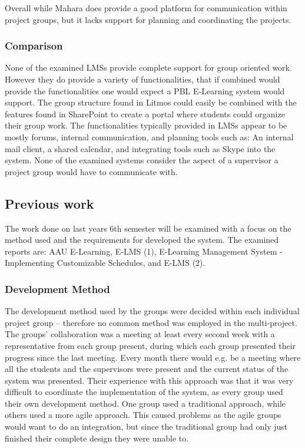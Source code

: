 Overall while Mahara does provide a good platform for communication within project groups, but it lacks support for planning and coordinating the projects.

\subsubsection{Comparison}
None of the examined LMSs provide complete support for group oriented work.
However they do provide a variety of functionalities, that if combined would provide the functionalities one would expect a PBL E-Learning system would support.
The group structure found in Litmos could easily be combined with the features found in SharePoint to create a portal where students could organize their group work.
The functionalities typically provided in LMSs appear to be mostly forums, internal communication, and planning tools such as: An internal mail client, a shared calendar, and integrating tools such as Skype into the system.
None of the examined systems consider the aspect of a supervisor a project group would have to communicate with.

\subsection{Previous work}
The work done on last years 6th semester will be examined with a focus on the method used and the requirements for developed the system. 
The examined reports are: AAU E-Learning, E-LMS (1), E-Learning Management System - Implementing Customizable Schedules, and E-LMS (2).


\subsubsection{Development Method}
The development method used by the groups were decided within each individual project group -- therefore no common method was employed in the multi-project.
The groups' collaboration was a meeting at least every second week with a representative from each group present, during which each group presented their progress since the last meeting.
Every month there would	e.g. be a meeting where all the students and the supervisors were present and the current status of the system was presented.
Their experience with this approach was that it was very difficult to coordinate the implementation of the system, as every group used their own development method. 
One group used a traditional approach, while others used a more agile approach.
This caused problems as the agile groups would want to do an integration, but since the traditional group had only just finished their complete design they were unable to.

